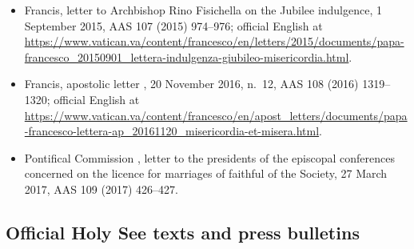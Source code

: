 \begin{itemize}
\item Francis, letter to Archbishop Rino Fisichella on the Jubilee
indulgence, 1 September 2015, AAS 107 (2015) 974--976; official English
at
\url{https://www.vatican.va/content/francesco/en/letters/2015/documents/papa-francesco_20150901_lettera-indulgenza-giubileo-misericordia.html}.
\item Francis, apostolic letter ,
20 November 2016, n.~12, AAS 108 (2016) 1319--1320; official English at
\url{https://www.vatican.va/content/francesco/en/apost_letters/documents/papa-francesco-lettera-ap_20161120_misericordia-et-misera.html}.
\item Pontifical Commission , letter to the presidents
of the episcopal conferences concerned on the licence for marriages of
faithful of the Society, 27 March 2017, AAS 109 (2017) 426--427.
\end{itemize}

\subsection*{Official Holy See texts and press bulletins}

